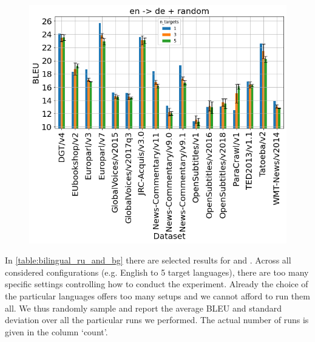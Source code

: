 \begin{figure}[h]
	\centering
	\includegraphics[width=1.0\columnwidth]{img/random_en_de.png}
	\label{fig:random_en_de}
\end{figure}

In \cref{table:bilingual_ru_and_bg} there are selected results
for  and .
Across all considered configurations (e.g. English to 5 target languages),
there are too many specific settings controlling how to conduct the experiment.
Already the choice of the particular languages offers too many setups
and we cannot afford to run them all.
We thus randomly sample and report the average BLEU and standard deviation
over all the particular runs we performed.
The actual number of runs is given in the column `count'.


